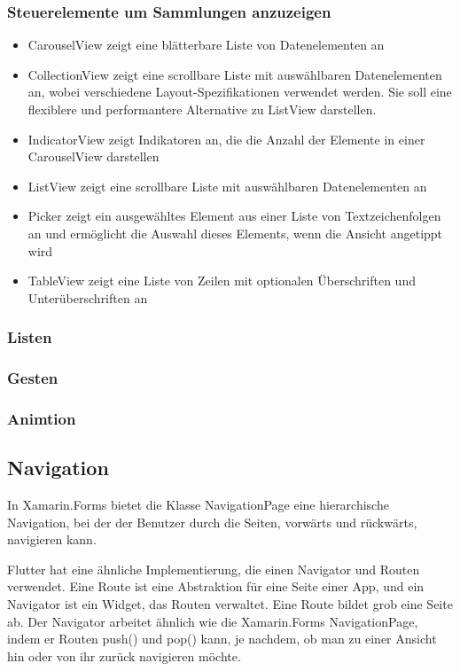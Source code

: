 \subsubsection{Steuerelemente um Sammlungen anzuzeigen}
\begin{itemize}
\setlength\itemsep{-0.6em}
 \item CarouselView zeigt eine blätterbare Liste von Datenelementen an
 \item CollectionView zeigt eine scrollbare Liste mit auswählbaren Datenelementen an, wobei verschiedene Layout-Spezifikationen verwendet werden. Sie soll eine flexiblere und performantere Alternative zu ListView darstellen. 
  \item IndicatorView zeigt Indikatoren an, die die Anzahl der Elemente in einer CarouselView darstellen
 \item ListView zeigt eine scrollbare Liste mit auswählbaren Datenelementen an
 \item Picker zeigt ein ausgewähltes Element aus einer Liste von Textzeichenfolgen an und ermöglicht die Auswahl dieses Elements, wenn die Ansicht angetippt wird
 \item TableView zeigt eine Liste von Zeilen mit optionalen Überschriften und Unterüberschriften an
\end{itemize}

\subsubsection{Listen}
\subsubsection{Gesten}
\subsubsection{Animtion}

\subsection{Navigation}
In Xamarin.Forms bietet die Klasse NavigationPage eine hierarchische Navigation, bei der der Benutzer durch die Seiten, vorwärts und rückwärts, navigieren kann.

Flutter hat eine ähnliche Implementierung, die einen Navigator und Routen verwendet. Eine Route ist eine Abstraktion für eine Seite einer App, und ein Navigator ist ein Widget, das Routen verwaltet. Eine Route bildet grob eine Seite ab. Der Navigator arbeitet ähnlich wie die Xamarin.Forms NavigationPage, indem er Routen push() und pop() kann, je nachdem, ob man zu einer Ansicht hin oder von ihr zurück navigieren möchte.

